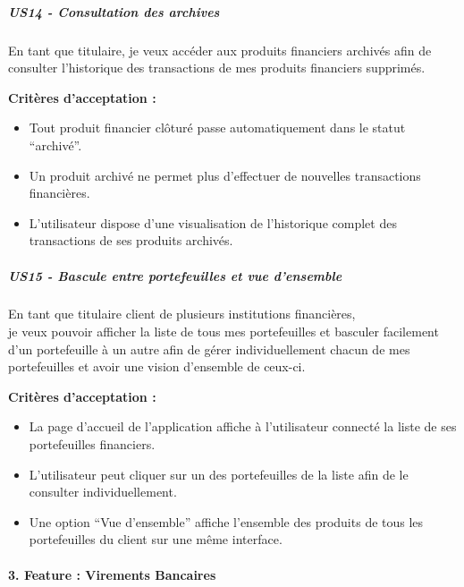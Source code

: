 \hypertarget{us14---consultation-des-archives}{%
\subparagraph{US14 - Consultation des
archives}\label{us14---consultation-des-archives}}

En tant que titulaire, je veux accéder aux produits financiers archivés
afin de consulter l'historique des transactions de mes produits
financiers supprimés.

\textbf{Critères d'acceptation :}

\begin{itemize}
\tightlist
\item
  Tout produit financier clôturé passe automatiquement dans le statut
  ``archivé''.
\item
  Un produit archivé ne permet plus d'effectuer de nouvelles
  transactions financières.
\item
  L'utilisateur dispose d'une visualisation de l'historique complet des
  transactions de ses produits archivés.
\end{itemize}

\hypertarget{us15---bascule-entre-portefeuilles-et-vue-densemble}{%
\subparagraph{US15 - Bascule entre portefeuilles et vue
d'ensemble}\label{us15---bascule-entre-portefeuilles-et-vue-densemble}}

En tant que titulaire client de plusieurs institutions financières,\\
je veux pouvoir afficher la liste de tous mes portefeuilles et basculer
facilement d'un portefeuille à un autre afin de gérer individuellement
chacun de mes portefeuilles et avoir une vision d'ensemble de ceux-ci.

\textbf{Critères d'acceptation :}

\begin{itemize}
\tightlist
\item
  La page d'accueil de l'application affiche à l'utilisateur connecté la
  liste de ses portefeuilles financiers.
\item
  L'utilisateur peut cliquer sur un des portefeuilles de la liste afin
  de le consulter individuellement.
\item
  Une option ``Vue d'ensemble'' affiche l'ensemble des produits de tous
  les portefeuilles du client sur une même interface.
\end{itemize}

\hypertarget{feature-virements-bancaires}{%
\paragraph{3. Feature : Virements
Bancaires}\label{feature-virements-bancaires}}

